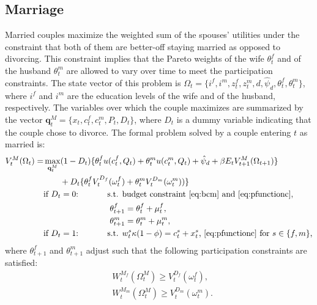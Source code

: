 \documentclass[12pt]{article}
\begin{document}
\subsection{Marriage}
Married couples maximize the weighted sum of the spouses' utilities under the constraint that both of them are better-off staying married as opposed to divorcing. This constraint implies that the Pareto weights of the wife $\theta^f_t$ and of the husband $\theta^m_t$ are allowed to vary over time to meet the participation constraints. The state vector of this problem is $\Omega_t=\{i^f,i^m,z^f_t,z^m_t,d,\hat{\psi}_d,\theta^f_t,\theta^m_t\}$, where $i^f$ and $i^m$ are the education levels of the wife and of the husband, respectively. The variables over which the couple maximizes are summarized by the vector $\mathbf{q}^M_t=\{x_t,c^f_t,c^m_t,P_t,D_t\}$, where $D_t$ is a dummy variable indicating that the couple chose to divorce. The formal problem solved by a couple entering $t$ as married is:
\begin{equation}\label{eq:v_uni}
\begin{split}
V_t^{M}(\Omega_t)=&\max_{\mathbf{q}^M_t} (1-D_t)\{\theta^f_{t}u(c^f_t,Q_t)+\theta^m_{t} u(c^m_t,Q_t)+\hat{\psi}_d+\beta E_t V^{M}_{t+1}(\Omega_{t+1})\}\\ &\quad\quad+D_t \{\theta^f_{t}V^{D_f}_{t}(\omega^{f}_{t})+\theta^m_{t} V^{D_m}_{t}(\omega^{m}_{t}))\}
\\ &\text{if $D_t=0$:}\hspace{35pt}\text{s.t. budget constraint \eqref{eq:bcm} and \eqref{eq:pfunctionc},}\\ &\hspace{80pt}
\theta^f_{t+1}=\theta^f_{t}+\mu^f_t,\\ &\hspace{80pt}
\theta^m_{t+1}=\theta^m_{t}+\mu^m_t,
\\ &\text{if $D_t=1$:}\hspace{35pt}\text{s.t. $w^s_t\kappa(1-\phi)=c^s_t+x^s_t$, \eqref{eq:pfunctionc} for $s\in\{f,m\}$,}
\end{split}
\end{equation}
where $\theta^f_{t+1}$ and $\theta^m_{t+1}$ adjust such that the following participation constraints are satisfied:
\begin{equation}\label{eq:p_cons_mar}
\begin{split}
&
W^{M_f}_{t}(\Omega^{M}_{t})\geq V_{t}^{D_f}(\omega^f_{t}),\\ &
W^{M_m}_{t}(\Omega^{M}_{t})\geq V_{t}^{D_m}(\omega^m_{t}). 
\end{split}
\end{equation}
\end{document}
